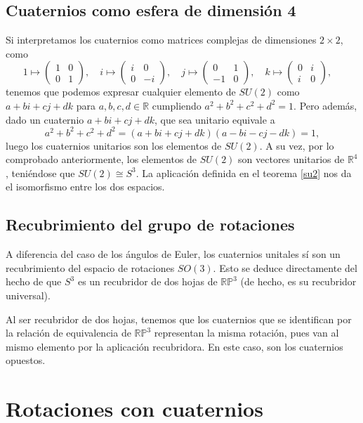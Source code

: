 \documentclass{article}
\theoremstyle{plain}
\theoremstyle{definition}
\theoremstyle{remark}
\begin{document}
\subsection{Cuaternios como esfera de dimensión 4}
Si interpretamos los cuaternios como matrices complejas de dimensiones
$2 \times 2$, como
\[
  1 \mapsto \begin{pmatrix} 1 & 0 \\ 0 & 1 \end{pmatrix},\quad
  i \mapsto \begin{pmatrix} i & 0 \\ 0 &-i \end{pmatrix},\quad
  j \mapsto \begin{pmatrix} 0 & 1 \\-1 & 0 \end{pmatrix},\quad
  k \mapsto \begin{pmatrix} 0 & i \\ i & 0 \end{pmatrix},\quad
\]
tenemos que podemos expresar cualquier elemento de $SU(2)$ como
$a + bi + cj + dk$ para $a,b,c,d \in \mathbb{R}$ cumpliendo
$a^2+b^2+c^2+d^2 = 1$. Pero además, dado un cuaternio $a + bi + cj + dk$,
que sea unitario equivale a
\[a^2+b^2+c^2+d^2 = (a+bi+cj+dk)(a-bi-cj-dk) = 1,\]
luego los cuaternios unitarios son los elementos de $SU(2)$.
A su vez, por lo comprobado anteriormente, los elementos de
$SU(2)$ son vectores unitarios de $\mathbb{R}^4$, teniéndose
que $SU(2) \cong S^3$. La aplicación definida
en el teorema \ref{su2} nos da el isomorfismo entre los dos espacios.
\cite{gelfand63}

\subsection{Recubrimiento del grupo de rotaciones}

A diferencia del caso de los ángulos de Euler, los cuaternios unitales
sí son un recubrimiento del espacio de rotaciones $SO(3)$. Esto se
deduce directamente del hecho de que $S^3$ es un recubridor de dos
hojas de $\mathbb{RP}^3$ (de hecho, es su recubridor universal).

Al ser recubridor de dos hojas, tenemos que los cuaternios que se
identifican por la relación de equivalencia de $\mathbb{RP}^3$
representan la misma rotación, pues van al mismo elemento por la
aplicación recubridora. En este caso, son los cuaternios opuestos.


\section{Rotaciones con cuaternios}
\end{document}
